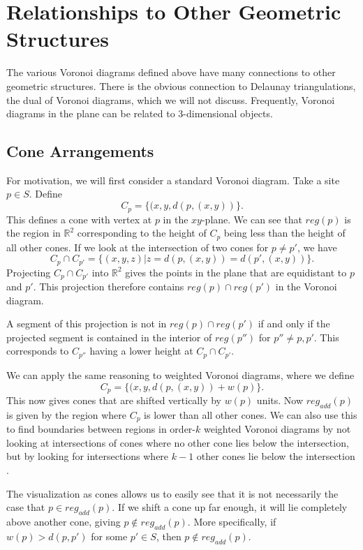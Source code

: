 \documentclass[a4paper, 11pt]{article}
\newcommand{\R}{\mathbb{R}}
\begin{document}
\section{Relationships to Other Geometric Structures}
\label{sec:geom_rel}
The various Voronoi diagrams defined above have many connections to other geometric structures. There is the obvious connection to Delaunay
triangulations, the dual of Voronoi diagrams, which we will not discuss. Frequently, Voronoi diagrams in the plane can be related to 3-dimensional
objects.

\subsection{Cone Arrangements}
\label{cone}
For motivation, we will first consider a standard Voronoi diagram. Take a site $p \in S$. Define
\[ C_p = \{ (x, y, d(p, (x,y)) \}. \]
This defines a cone with vertex at $p$ in the $xy$-plane. We can see that $reg(p)$ is the region in $\R^2$ corresponding to the height of $C_p$ being
less than the height of all other cones. If we look at the intersection of two cones for $p \neq p'$, we have
\[ C_p \cap C_{p'} = \{ (x,y,z) | z = d(p, (x,y)) = d(p', (x,y)) \}. \]
Projecting $C_p \cap C_{p'}$ into $\R^2$ gives the points in the plane that are equidistant to $p$ and $p'$. This projection therefore contains
$reg(p) \cap reg(p')$ in the Voronoi diagram.

A segment of this projection is not in $reg(p) \cap reg(p')$ if and only if the projected segment is contained in the interior of $reg(p'')$ for $p''
\neq p, p'$. This corresponds to $C_{p''}$ having a lower height at $C_p \cap C_{p'}$.

We can apply the same reasoning to weighted Voronoi diagrams, where we define
\[ C_p = \{ (x, y, d(p, (x,y)) + w(p) \}. \]
This now gives cones that are shifted vertically by $w(p)$ units. Now $reg_{add}(p)$ is given by the region where $C_p$ is lower than all other cones.
We can also use this to find boundaries between regions in order-$k$ weighted Voronoi diagrams by not looking at intersections of cones where no other
cone lies below the intersection, but by looking for intersections where $k-1$ other cones lie below the intersection \cite{rosenberger_additive}.

The visualization as cones allows us to easily see that it is not necessarily the case that $p \in reg_{add}(p)$. If we shift a cone up far enough, it
will lie completely above another cone, giving $p \notin reg_{add}(p)$. More specifically, if $w(p) > d(p,p')$ for some $p' \in S$, then $p \notin
reg_{add}(p)$.
\end{document}
